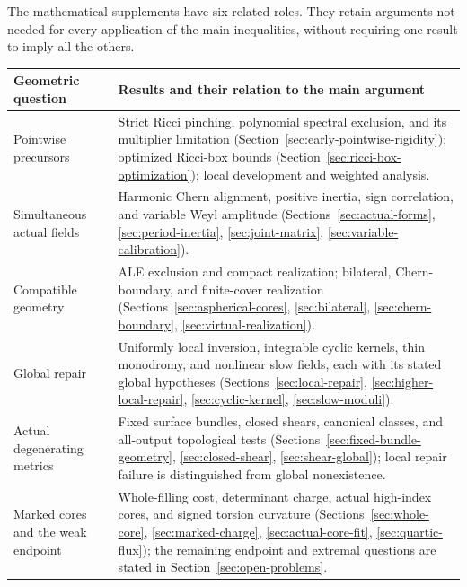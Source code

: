 \documentclass[10pt,a4paper]{article}
\theoremstyle{definition}
\theoremstyle{remark}
\numberwithin{equation}{section}
\begin{document}
The mathematical supplements have six related roles. They retain
arguments not needed for every application of the main inequalities,
without requiring one result to imply all the others.
\begin{center}
\small
\begin{tabularx}{\textwidth}{@{}p{}X@{}}
\toprule
Geometric question & Results and their relation to the main argument\\
\midrule
Pointwise precursors &
Strict Ricci pinching, polynomial spectral exclusion, and its multiplier
limitation (Section~\ref{sec:early-pointwise-rigidity}); optimized
Ricci-box bounds (Section~\ref{sec:ricci-box-optimization}); local
development and weighted analysis.\\
Simultaneous actual fields &
Harmonic Chern alignment, positive inertia, sign correlation, and
variable Weyl amplitude (Sections~\ref{sec:actual-forms},
\ref{sec:period-inertia}, \ref{sec:joint-matrix},
\ref{sec:variable-calibration}).\\
Compatible geometry &
ALE exclusion and compact realization; bilateral, Chern-boundary,
and finite-cover realization (Sections~\ref{sec:aspherical-cores},
\ref{sec:bilateral}, \ref{sec:chern-boundary},
\ref{sec:virtual-realization}).\\
Global repair &
Uniformly local inversion, integrable cyclic kernels, thin monodromy,
and nonlinear slow fields, each with its stated global hypotheses
(Sections~\ref{sec:local-repair}, \ref{sec:higher-local-repair},
\ref{sec:cyclic-kernel}, \ref{sec:slow-moduli}).\\
Actual degenerating metrics &
Fixed surface bundles, closed shears, canonical classes, and
all-output topological tests (Sections~\ref{sec:fixed-bundle-geometry},
\ref{sec:closed-shear}, \ref{sec:shear-global}); local repair
failure is distinguished from global nonexistence.\\
Marked cores and the weak endpoint &
Whole-filling cost, determinant charge, actual high-index cores,
and signed torsion curvature (Sections~\ref{sec:whole-core},
\ref{sec:marked-charge}, \ref{sec:actual-core-fit},
\ref{sec:quartic-flux}); the remaining endpoint and extremal
questions are stated in Section~\ref{sec:open-problems}.\\
\bottomrule
\end{tabularx}
\end{center}
\clearpage
\end{document}
